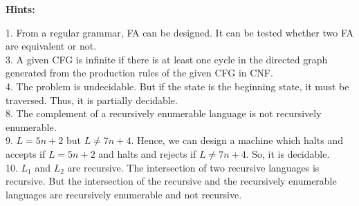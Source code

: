\documentclass[8pt]{beamer}
\begin{document}
\begin{frame}
\vspace*{0.4cm}

\hspace*{-0.5cm}
\textbf{Hints:}

\vspace*{0.1cm}
1. From a regular grammar, FA can be designed. It can be tested whether two FA are equivalent
or not.\\

\vspace*{0.2cm}
3. A given CFG is infinite if there is at least one cycle in the directed graph generated from the
production rules of the given CFG in CNF.\\

\vspace*{0.2cm}
4. The problem is undecidable. But if the state is the beginning state, it must be traversed. Thus, it is
partially decidable.\\

\vspace*{0.2cm}
8. The complement of a recursively enumerable language is not recursively enumerable.\\

\vspace*{0.2cm}
9. $L = 5n + 2$ but $L \neq 7n + 4$. Hence, we can design a machine which halts and accepts if $L = 5n + 2$
and halts and rejects if $L \neq 7n + 4$. So, it is decidable.\\

\vspace*{0.2cm}
10. $L _{1}$ and $L _{2}$ are recursive. The intersection of two recursive languages is recursive. But the intersection
of the recursive and the recursively enumerable languages are recursively enumerable and
not recursive.\\

\vspace*{0.2cm}
\end{frame}
\end{document}
